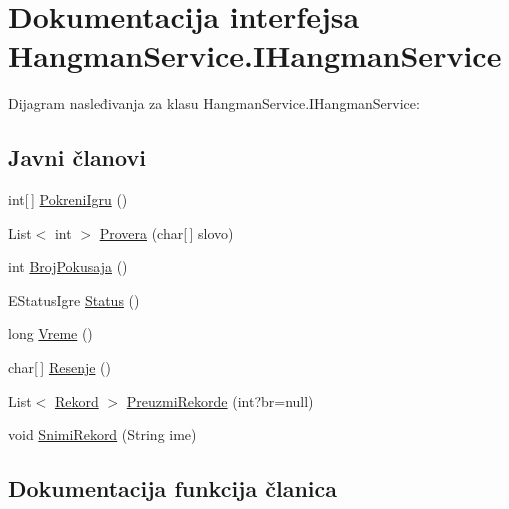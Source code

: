 \hypertarget{interfaceHangmanService_1_1IHangmanService}{}\section{Dokumentacija interfejsa Hangman\+Service.\+I\+Hangman\+Service}
\label{interfaceHangmanService_1_1IHangmanService}


Dijagram nasleđivanja za klasu Hangman\+Service.\+I\+Hangman\+Service\+:
\subsection*{Javni članovi}
\begin{DoxyCompactItemize}
\item 
int\mbox{[}$\,$\mbox{]} \hyperlink{interfaceHangmanService_1_1IHangmanService_a7fa5b5070128d0ad0f68d4ea1b77137d}{Pokreni\+Igru} ()
\item 
List$<$ int $>$ \hyperlink{interfaceHangmanService_1_1IHangmanService_ac910137aaa469b3dcc82a37f07292e40}{Provera} (char\mbox{[}$\,$\mbox{]} slovo)
\item 
int \hyperlink{interfaceHangmanService_1_1IHangmanService_a078ead45c2322be60eb7e2ab52d2f78c}{Broj\+Pokusaja} ()
\item 
E\+Status\+Igre \hyperlink{interfaceHangmanService_1_1IHangmanService_a881da61cc71a3db33062b22523194a33}{Status} ()
\item 
long \hyperlink{interfaceHangmanService_1_1IHangmanService_a0a85db4364ae98095cd7b89e2e4f33f9}{Vreme} ()
\item 
char\mbox{[}$\,$\mbox{]} \hyperlink{interfaceHangmanService_1_1IHangmanService_ae518473d150a39a6a46d0a0b7b0fbff4}{Resenje} ()
\item 
List$<$ \hyperlink{classHangman_1_1Rekord}{Rekord} $>$ \hyperlink{interfaceHangmanService_1_1IHangmanService_a5a9bf5181cf96c446653fb94991d8f4f}{Preuzmi\+Rekorde} (int?br=null)
\item 
void \hyperlink{interfaceHangmanService_1_1IHangmanService_a21580f0656289f72a538a2a664b0a1ae}{Snimi\+Rekord} (String ime)
\end{DoxyCompactItemize}


\subsection{Dokumentacija funkcija članica}
\hypertarget{interfaceHangmanService_1_1IHangmanService_a078ead45c2322be60eb7e2ab52d2f78c}{}
